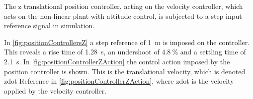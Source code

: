 \begin{minipage}{\linewidth}
\begin{minipage}{0.45\linewidth}
\begin{figure}[H]
            \centering
            \label{fig:velocityControllerZAction}
        \end{figure}
    \end{minipage}
\end{minipage}

The z translational position controller, acting on the velocity controller, which acts on the non-linear plant with attitude control, is subjected to a step input reference signal in simulation.

In \autoref{fig:positionControllersZ} a step reference of \SI{1}{m} is imposed on the controller. This reveals a rise time of \SI{1.28}{s}, an undershoot of  $4.8\ \%$ and a settling time of \SI{2.1}{s}. In \autoref{fig:positionControllerZAction} the control action imposed by the position controller is shown. This is the translational velocity, which is denoted zdot Reference in \autoref{fig:positionControllerZAction}, where zdot is the velocity applied by the velocity controller.

